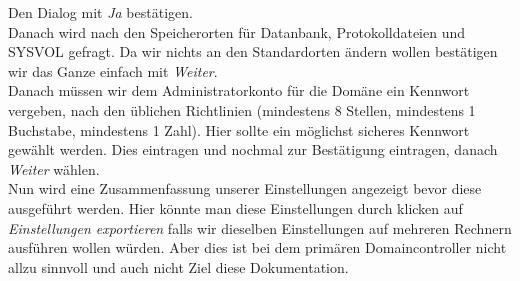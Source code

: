 \documentclass[12pt,a4paper,titlepage]{article} %
\begin{document}
Den Dialog mit \emph{Ja} bestätigen.\\
Danach wird nach den Speicherorten für Datanbank, Protokolldateien und SYSVOL gefragt. Da wir nichts an den Standardorten ändern wollen bestätigen wir das Ganze einfach mit \emph{Weiter}.\\
Danach müssen wir dem Administratorkonto für die Domäne ein Kennwort vergeben, nach den üblichen Richtlinien (mindestens 8 Stellen, mindestens 1 Buchstabe, mindestens 1 Zahl). Hier sollte ein möglichst sicheres Kennwort gewählt werden. Dies eintragen und nochmal zur Bestätigung eintragen, danach \emph{Weiter} wählen.\\
Nun wird eine Zusammenfassung unserer Einstellungen angezeigt bevor diese ausgeführt werden. Hier könnte man diese Einstellungen durch klicken auf \emph{Einstellungen exportieren} falls wir dieselben Einstellungen auf mehreren Rechnern ausführen wollen würden. Aber dies ist bei dem primären Domaincontroller nicht allzu sinnvoll und auch nicht Ziel diese Dokumentation.
\end{document}
